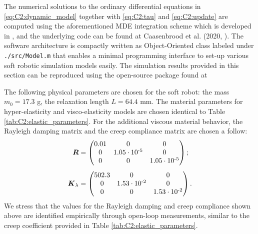 The numerical solutions to the ordinary differential equations in \eqref{eq:C2:dynamic_model} together with \eqref{eq:C2:tau} and \eqref{eq:C2:update} are computed using the aforementioned MDE integration scheme which is developed in \matlab, and the underlying code can be found at Caasenbrood et al. (2020, \cite{Caasenbrood2021}). The software architecture is compactly written as Object-Oriented class labeled under \texttt{./src/Model.m} that enables a minimal programming interface to set-up various soft robotic simulation models easily. 
The simulation results provided in this section can be reproduced using the open-source \sorotoki package found at \cite{SorotokiCode}
%
\begin{example}
\end{example}
The following physical parameters are chosen for the soft robot: the mass $m_0 = 17.3$ g, the relaxation length $L = 64.4$ mm. The material parameters for hyper-elasticity and visco-elasticity models are chosen identical to Table \ref{tab:C2:elastic_parameters}. For the additional viscous material behavior, the Rayleigh damping matrix and the creep compliance matrix are chosen a follow:
%
\begin{align}
\boldsymbol{R} & = \begin{pmatrix} 0.01 & 0 & 0 \\ 0 &  1.05\cdot10^{\textrm{-5}} & 0 \\ 0 & 0 & 1.05\cdot10^{\textrm{-5}} \end{pmatrix}; \notag \\[0.45em]
\boldsymbol{K}_{\lambda} & = \begin{pmatrix} 502.3 & 0 & 0 \\ 0 &  1.53\cdot10^{\textrm{-2}} & 0 \\ 0 & 0 & 1.53\cdot10^{\textrm{-2}} \end{pmatrix}. \notag
\end{align}
%
\noindent We stress that the values for the Rayleigh damping and creep compliance shown above are identified empirically {through} open-loop measurements, similar to the creep coefficient provided in Table \ref{tab:C2:elastic_parameters}.

%

